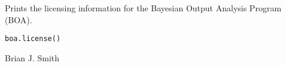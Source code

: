 \begin{Description}\relax
Prints the licensing information for the Bayesian Output Analysis Program
(BOA).
\end{Description}
\begin{Usage}
\begin{verbatim}
boa.license()
\end{verbatim}
\end{Usage}
\begin{Author}\relax
Brian J. Smith
\end{Author}
\begin{SeeAlso}\relax
{}
\end{SeeAlso}

